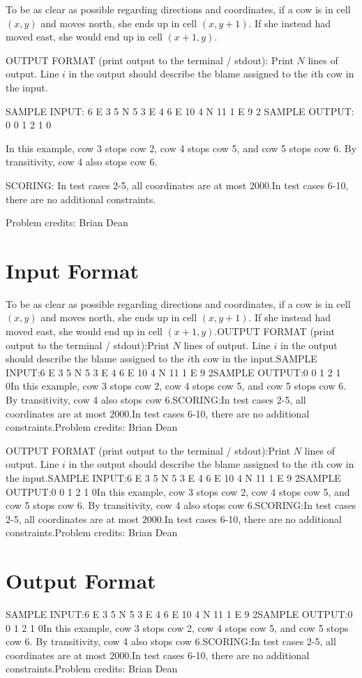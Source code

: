 \documentclass[12pt]{article}
\begin{document}
To be as clear as possible regarding directions and coordinates, if a cow is in
cell $(x,y)$ and moves north, she ends up in cell $(x,y+1)$.  If she instead had
moved east, she would end up in cell $(x+1, y)$.

OUTPUT FORMAT (print output to the terminal / stdout):
Print $N$ lines of output.  Line $i$ in the output should describe the blame
assigned to the $i$th cow in the input.

SAMPLE INPUT:
6
E 3 5
N 5 3
E 4 6
E 10 4
N 11 1
E 9 2
SAMPLE OUTPUT: 
0
0
1
2
1
0

In this example, cow 3 stops cow 2, cow 4 stops cow 5, and cow 5 stops cow 6. By transitivity, 
cow 4 also stops cow 6.

SCORING:
In test cases 2-5, all coordinates are at most $2000$.In test cases 6-10, there are no additional constraints.


Problem credits: Brian Dean



\section*{Input Format}
To be as clear as possible regarding directions and coordinates, if a cow is in
cell $(x,y)$ and moves north, she ends up in cell $(x,y+1)$.  If she instead had
moved east, she would end up in cell $(x+1, y)$.OUTPUT FORMAT (print output to the terminal / stdout):Print $N$ lines of output.  Line $i$ in the output should describe the blame
assigned to the $i$th cow in the input.SAMPLE INPUT:6
E 3 5
N 5 3
E 4 6
E 10 4
N 11 1
E 9 2SAMPLE OUTPUT:0
0
1
2
1
0In this example, cow 3 stops cow 2, cow 4 stops cow 5, and cow 5 stops cow 6. By transitivity, 
cow 4 also stops cow 6.SCORING:In test cases 2-5, all coordinates are at most $2000$.In test cases 6-10, there are no additional constraints.Problem credits: Brian Dean

OUTPUT FORMAT (print output to the terminal / stdout):Print $N$ lines of output.  Line $i$ in the output should describe the blame
assigned to the $i$th cow in the input.SAMPLE INPUT:6
E 3 5
N 5 3
E 4 6
E 10 4
N 11 1
E 9 2SAMPLE OUTPUT:0
0
1
2
1
0In this example, cow 3 stops cow 2, cow 4 stops cow 5, and cow 5 stops cow 6. By transitivity, 
cow 4 also stops cow 6.SCORING:In test cases 2-5, all coordinates are at most $2000$.In test cases 6-10, there are no additional constraints.Problem credits: Brian Dean

\section*{Output Format}
SAMPLE INPUT:6
E 3 5
N 5 3
E 4 6
E 10 4
N 11 1
E 9 2SAMPLE OUTPUT:0
0
1
2
1
0In this example, cow 3 stops cow 2, cow 4 stops cow 5, and cow 5 stops cow 6. By transitivity, 
cow 4 also stops cow 6.SCORING:In test cases 2-5, all coordinates are at most $2000$.In test cases 6-10, there are no additional constraints.Problem credits: Brian Dean
\end{document}
